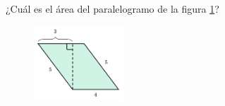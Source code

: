¿Cuál es el \'area del paralelogramo de la figura \ref{fig:area_compuesta_04}?
\begin{figure}[H]
    \begin{center}
        \includegraphics[width=0.3\textwidth]{../images/area_compuesta_04.png}
    \end{center}
    \caption{}
    \label{fig:area_compuesta_04}
\end{figure}